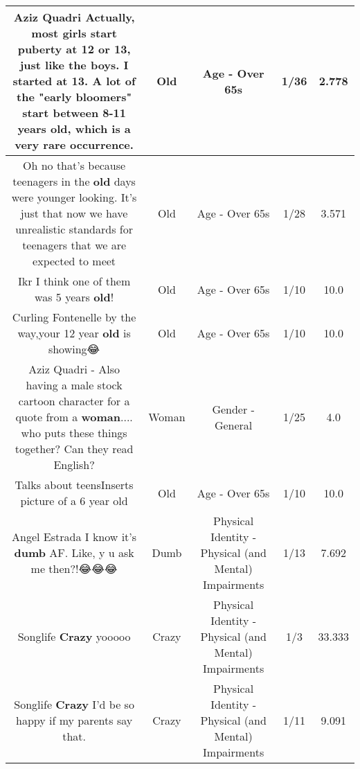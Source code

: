 \documentclass[11pt]{article}
\newlength\mylength
\begin{document}
\begin{center}
\begin{longtable}{|C{.65\mylength}|C{.30\mylength}|C{.12\mylength}|C{.12\mylength}|C{.12\mylength}|}
  \small Aziz Quadri Actually, most girls start puberty at 12 or 13, just like the boys. I started at 13. A lot of the "early bloomers" start between 8-11 years \textbf{old}, which is a very rare occurrence.\normalsize   & Old & Age - Over 65s & 1/36 & 2.778 \\  \hline
  \small Oh no that's because teenagers in the \textbf{old} days were younger looking. It's just that now we have unrealistic standards for teenagers that we are expected to meet\normalsize   & Old & Age - Over 65s & 1/28 & 3.571 \\  \hline
  \small Ikr I think one of them was 5 years \textbf{old}!\normalsize   & Old & Age - Over 65s & 1/10 & 10.0 \\  \hline
  \small Curling Fontenelle by the way,your 12 year \textbf{old} is showing😂\normalsize   & Old & Age - Over 65s & 1/10 & 10.0 \\  \hline
  \small Aziz Quadri - Also having a male stock cartoon character for a quote from a \textbf{woman}.... who puts these things together? Can they read English?\normalsize   & Woman & Gender - General & 1/25 & 4.0 \\  \hline
  \small Talks about teensInserts picture of a 6 year old\normalsize   & Old & Age - Over 65s & 1/10 & 10.0 \\  \hline
  \small Angel Estrada I know it's \textbf{dumb} AF. Like, y u ask me then?!😂😂😂\normalsize   & Dumb & Physical Identity - Physical (and Mental) Impairments & 1/13 & 7.692 \\  \hline
  \small Songlife \textbf{Crazy} yooooo\normalsize   & Crazy & Physical Identity - Physical (and Mental) Impairments & 1/3 & 33.333 \\  \hline
  \small Songlife \textbf{Crazy} I'd be so happy if my parents say that.\normalsize   & Crazy & Physical Identity - Physical (and Mental) Impairments & 1/11 & 9.091 \\  \hline

\end{longtable}
\end{center}
\end{document}
